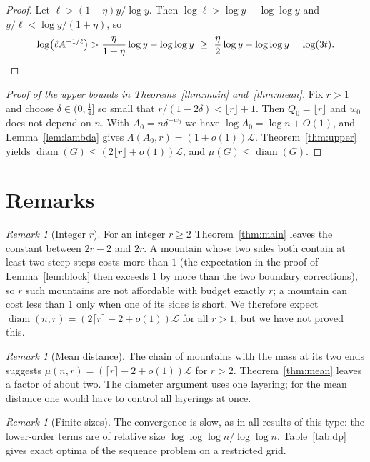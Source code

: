 \documentclass[11pt]{amsart}
\theoremstyle{definition}
\theoremstyle{remark}
\newtheorem{remark}[theorem]{Remark}
\newcommand{\diam}{\operatorname{diam}}
\newcommand{\Lz}{\mathcal{L}}
\begin{document}
\begin{proof}
Let $\ell>(1+\eta)y/\log y$. Then $\log\ell>\log y-\log\log y$ and $y/\ell<\log y/(1+\eta)$, so
\[
\log\bigl(\ell A^{-1/\ell}\bigr)>\frac{\eta}{1+\eta}\log y-\log\log y\ \ge\ \frac\eta2\log y-\log\log y=\log(3t).\qedhere
\]
\end{proof}

\begin{proof}[Proof of the upper bounds in Theorems~\ref{thm:main} and~\ref{thm:mean}]
Fix $r>1$ and choose $\delta\in(0,\frac14]$ so small that $r/(1-2\delta)<\lfloor r\rfloor+1$. Then $Q_0=\lfloor r\rfloor$ and $w_0$ does not depend on $n$.
With $A_0=n\delta^{-w_0}$ we have $\log A_0=\log n+O(1)$, and Lemma~\ref{lem:lambda} gives $\Lambda(A_0,r)=(1+o(1))\Lz$.
Theorem~\ref{thm:upper} yields $\diam(G)\le(2\lfloor r\rfloor+o(1))\Lz$, and $\mu(G)\le\diam(G)$.
\end{proof}

\section{Remarks}\label{sec:remarks}

\begin{remark}[Integer $r$]
For an integer $r\ge2$ Theorem~\ref{thm:main} leaves the constant between $2r-2$ and $2r$.
A mountain whose two sides both contain at least two steep steps costs more than $1$ (the expectation in the proof of Lemma~\ref{lem:block} then exceeds $1$ by more than the two boundary corrections), so $r$ such mountains are not affordable with budget exactly $r$; a mountain can cost less than $1$ only when one of its sides is short.
We therefore expect $\diam(n,r)=(2\lceil r\rceil-2+o(1))\Lz$ for all $r>1$, but we have not proved this.
\end{remark}

\begin{remark}[Mean distance]
The chain of mountains with the mass at its two ends suggests $\mu(n,r)=(\lceil r\rceil-2+o(1))\Lz$ for $r>2$.
Theorem~\ref{thm:mean} leaves a factor of about two.
The diameter argument uses one layering; for the mean distance one would have to control all layerings at once.
\end{remark}

\begin{remark}[Finite sizes]
The convergence is slow, as in all results of this type: the lower-order terms are of relative size $\log\log\log n/\log\log n$.
Table~\ref{tab:dp} gives exact optima of the sequence problem on a restricted grid.
\end{remark}
\end{document}
